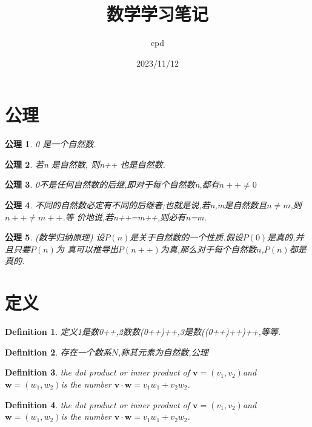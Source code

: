 \documentclass[UTF-8]{ctexart}
\newtheorem{definition}{Definition}[section]
\newtheorem{axiom}{公理}[section]
\begin{document}
\title {数学学习笔记} \author{cpd} \date{2023/11/12}
\maketitle

\tableofcontents
\newpage


\section{公理}
\begin{axiom}
0 是一个自然数.
\end{axiom}
\begin{axiom}
若n 是自然数, 则n++ 也是自然数.
\end{axiom}
\begin{axiom}
    0不是任何自然数的后继,即对于每个自然数n,都有$n++ \ne 0$
\end{axiom}
\begin{axiom}
不同的自然数必定有不同的后继者;也就是说,若n,m是自然数且$n \ne m$,则$n++\ne m++$.等
价地说,若n++=m++,则必有n=m.
\end{axiom}
\begin{axiom}
(数学归纳原理) 设$P(n)$是关于自然数的一个性质.假设$P(0)$是真的,并且只要$P(n)$为
真可以推导出$P(n++)$为真,那么对于每个自然数$n$,$P(n)$都是真的.
\end{axiom}
\section{定义}


\begin{definition}
定义1是数0++,2数数(0++)++,3是数((0++)++)++,等等.

\end{definition}

\begin{definition}
存在一个数系$N$,称其元素为自然数,公理

\end{definition}

\begin{definition}
  the dot product or inner product of $\mathbf{v}
=(v_1,v_2)$and$\mathbf{w}=(w_1,w_2)$is the number $\mathbf{v} \cdot \mathbf{w} = v_1w_1+v_2w_2$.

\end{definition}
\begin{definition}
  the dot product or inner product of $\mathbf{v}
=(v_1,v_2)$and$\mathbf{w}=(w_1,w_2)$is the number $\mathbf{v} \cdot \mathbf{w} = v_1w_1+v_2w_2$.

\end{definition}
\end{document}
